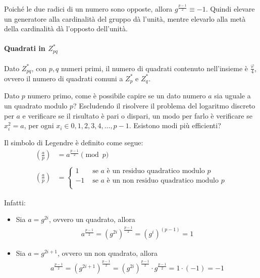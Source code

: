 \noindent Poiché le due radici di un numero sono opposte, allora $g^{\frac{p-1}{2}} \equiv -1$. Quindi elevare un generatore alla cardinalità del gruppo dà l'unità, mentre elevarlo alla metà della cardinalità dà l'opposto dell'unità.

\paragraph{Quadrati in $Z_{pq}^*$} Dato $Z_{pq}^*$, con $p, q$ numeri primi, il numero di quadrati contenuto nell'insieme è $\frac{\varphi}{4}$, ovvero il numero di quadrati comuni a $Z_{p}^*$ e $Z_{q}^*$.

\noindent Dato $p$ numero primo, come è possibile capire se un dato numero $a$ sia uguale a un quadrato modulo $p$? Escludendo il risolvere il problema del logaritmo discreto per $a$ e verificare se il risultato è pari o dispari, un modo per farlo è verificare se $x_i^2 = a$, per ogni $x_i \in 0, 1, 2, 3, 4, ..., p-1$. Esistono modi più efficienti? 

\begin{definition}
Il simbolo di Legendre è definito come segue:
\begin{align*}
    \left( \frac{a}{p} \right) &= a^{\frac{p-1}{2}} \pmod p\\\\
    \left( \frac{a}{p} \right) &= 
    \begin{cases}
        1 & \text{ se } a \text{ è un residuo quadratico modulo } p\\
        -1 & \text{ se } a \text{ è un non residuo quadratico modulo } p\\
    \end{cases}
\end{align*}
\end{definition}

\noindent Infatti:
\begin{itemize}
    \item Sia $a = g^{2i}$, ovvero un quadrato, allora
\begin{align*}
    a^{\frac{p-1}{2}}= (g^{2i})^{\frac{p-1}{2}} = (g^i)^{(p-1)} = 1
\end{align*}
\item Sia $a = g^{2i+1}$, ovvero un non quadrato, allora
\begin{align*}
    a^{\frac{p-1}{2}}= (g^{2i+1})^{\frac{p-1}{2}} = (g^{2i})^{\frac{p-1}{2}} \cdot g^{\frac{p-1}{2}} = 1 \cdot (-1) = -1
\end{align*}
\end{itemize}


